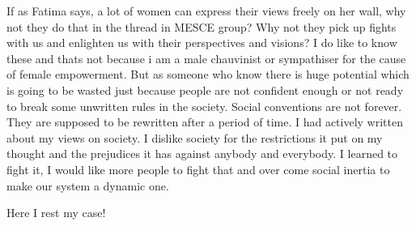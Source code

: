 If as Fatima says, a lot of women can express their views freely on her wall, why not they do that in the thread in MESCE group? Why not they pick up fights with us and enlighten us with their perspectives and visions? I do like to know these and thats not because i am a male chauvinist or sympathiser for the cause of female empowerment. But as someone who know there is huge potential which is going to be wasted just because people are not confident enough or not ready to break some unwritten rules in the society. Social conventions are not forever. They are supposed to be rewritten after a period of time. I had actively written about my views on society. I dislike society for the restrictions it put on my thought and the prejudices it has against anybody and everybody. I learned to fight it, I would like more people to fight that and over come social inertia to make our system a dynamic one.

Here I rest my case!


\newpage
